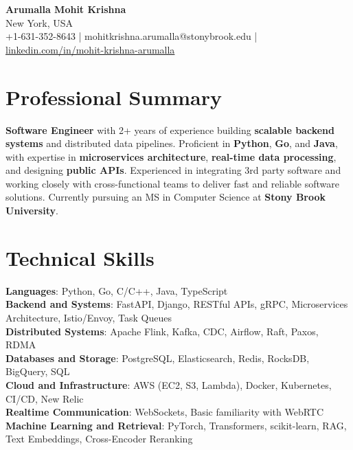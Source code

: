 \documentclass[letterpaper,11pt]{article}
\begin{document}
\begin{center}
  {\Large \textbf{Arumalla Mohit Krishna}} \\
  New York, USA \\
  +1-631-352-8643 \enspace | \enspace mohitkrishna.arumalla@stonybrook.edu \enspace | \enspace \href{https://www.linkedin.com/in/mohit-krishna-arumalla}{linkedin.com/in/mohit-krishna-arumalla}
\end{center}

\section{Professional Summary}
  \begin{itemize}[leftmargin=0.15in, label={}]
    \small{\item{
     \textbf{Software Engineer} with 2+ years of experience building \textbf{scalable backend systems} and distributed data pipelines. Proficient in \textbf{Python}, \textbf{Go}, and \textbf{Java}, with expertise in \textbf{microservices architecture}, \textbf{real-time data processing}, and designing \textbf{public APIs}. Experienced in integrating 3rd party software and working closely with cross-functional teams to deliver fast and reliable software solutions. Currently pursuing an MS in Computer Science at \textbf{Stony Brook University}.
    }}
  \end{itemize}
\vspace{-16pt}

\section{Technical Skills}
 \begin{itemize}[leftmargin=0.15in, label={}]
    \small{\item{
     \textbf{Languages}: Python, Go, C/C++, Java, TypeScript \\
     \textbf{Backend and Systems}: FastAPI, Django, RESTful APIs, gRPC, Microservices Architecture, Istio/Envoy, Task Queues \\
     \textbf{Distributed Systems}: Apache Flink, Kafka, CDC, Airflow, Raft, Paxos, RDMA \\
     \textbf{Databases and Storage}: PostgreSQL, Elasticsearch, Redis, RocksDB, BigQuery, SQL \\
     \textbf{Cloud and Infrastructure}: AWS (EC2, S3, Lambda), Docker, Kubernetes, CI/CD, New Relic \\
     \textbf{Realtime Communication}: WebSockets, Basic familiarity with WebRTC \\
     \textbf{Machine Learning and Retrieval}: PyTorch, Transformers, scikit-learn, RAG, Text Embeddings, Cross-Encoder Reranking
    }}
 \end{itemize}
\vspace{-16pt}
\end{document}
